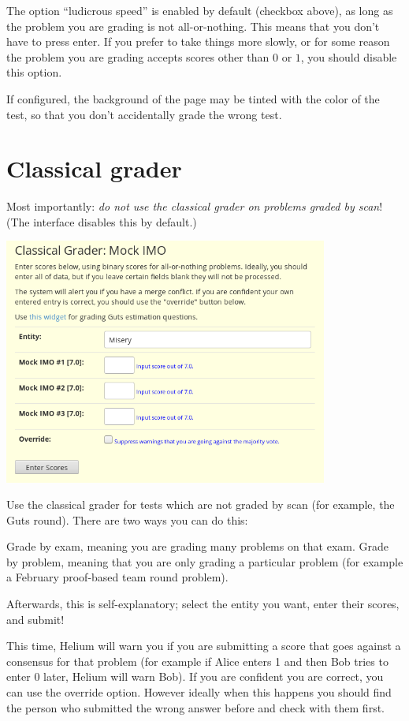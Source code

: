 The option ``ludicrous speed'' is enabled by default (checkbox above),
as long as the problem you are grading is not all-or-nothing.
This means that you don't have to press enter.
If you prefer to take things more slowly,
or for some reason the problem you are grading accepts
scores other than $0$ or $1$,
you should disable this option.

If configured, the background of the page may be tinted
with the color of the test, so that you don't accidentally grade
the wrong test.

\section{Classical grader}
Most importantly:
\emph{do not use the classical grader on problems graded by scan}!
(The interface disables this by default.)

\begin{center}
	\includegraphics[width=0.8\textwidth]{images/classicgrade.png}
\end{center}

Use the classical grader for tests which are not graded by scan
(for example, the Guts round).
There are two ways you can do this:
\begin{itemize}
	\ii Grade by exam, meaning you are grading many problems on that exam.
	\ii Grade by problem, meaning that you are only grading 
	a particular problem (for example a February proof-based team round problem).
\end{itemize}
Afterwards, this is self-explanatory;
select the entity you want, enter their scores, and submit!

This time, Helium will warn you if you are submitting
a score that goes against a consensus for that problem
(for example if Alice enters 1 and then Bob tries to enter 0 later,
Helium will warn Bob).
If you are confident you are correct, you can use the override option.
However ideally when this happens you should find the person
who submitted the wrong answer before and check with them first.

